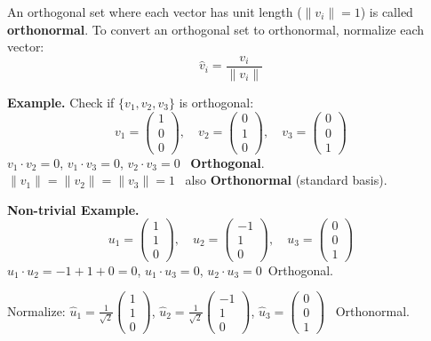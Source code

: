 \documentclass[12pt]{article}
\begin{document}
\begin{defbox}
An orthogonal set where each vector has unit length ($\|v_i\| = 1$) is called \textbf{orthonormal}. To convert an orthogonal set to orthonormal, normalize each vector:
\[
\hat{v}_i = \frac{v_i}{\|v_i\|}
\]
\end{defbox}

\textbf{Example.} Check if $\{v_1, v_2, v_3\}$ is orthogonal:
\[
v_1 = \begin{pmatrix}1\\0\\0\end{pmatrix},\quad v_2 = \begin{pmatrix}0\\1\\0\end{pmatrix},\quad v_3 = \begin{pmatrix}0\\0\\1\end{pmatrix}
\]
$v_1\cdot v_2 = 0$, $v_1\cdot v_3 = 0$, $v_2\cdot v_3 = 0$ \textrightarrow\ \textbf{Orthogonal}. \\[4pt]
$\|v_1\| = \|v_2\| = \|v_3\| = 1$ \textrightarrow\ also \textbf{Orthonormal} (standard basis).

\textbf{Non-trivial Example.}
\[
u_1 = \begin{pmatrix}1\\1\\0\end{pmatrix},\quad u_2 = \begin{pmatrix}-1\\1\\0\end{pmatrix},\quad u_3 = \begin{pmatrix}0\\0\\1\end{pmatrix}
\]
$u_1\cdot u_2 = -1+1+0 = 0$\checkmark, $u_1\cdot u_3 = 0$\checkmark, $u_2\cdot u_3 = 0$\checkmark \textrightarrow\ Orthogonal.

Normalize: $\hat{u}_1 = \frac{1}{\sqrt{2}}\begin{pmatrix}1\\1\\0\end{pmatrix}$, $\hat{u}_2 = \frac{1}{\sqrt{2}}\begin{pmatrix}-1\\1\\0\end{pmatrix}$, $\hat{u}_3 = \begin{pmatrix}0\\0\\1\end{pmatrix}$ \textrightarrow\ Orthonormal.
\end{document}

